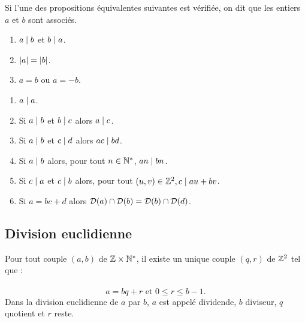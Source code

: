\begin{defprop}
    Si l’une des propositions équivalentes suivantes est vérifiée, on dit que les entiers \(a\) et \(b\) sont associés.
    \begin{enumerate}
        \item \(a \mid b\) et \(b \mid a\).
        \item \(\left\lvert a\right\rvert = \left\lvert b\right\rvert\).
        \item \(a = b\) ou \(a = -b\).
    \end{enumerate}
\end{defprop}

\begin{defprop}
    \begin{enumerate}
        \item \(a \mid a\).
        \item Si \(a \mid b\) et \(b \mid c\) alors \(a \mid c\).
        \item Si \(a \mid b\) et \(c \mid d\) alors \(ac \mid bd\).
        \item Si \(a \mid b\) alors, pour tout \(n \in \mathbb{N}^*\), \(an\mid bn\).
        \item Si \(c \mid a\) et \(c \mid b \) alors, pour tout \( (u, v) \in\mathbb{Z}^2, c \mid au + bv\).
        \item Si \(a = bc + d\) alors \(\mathcal{D}(a) \cap \mathcal{D}(b) = \mathcal{D}(b) \cap \mathcal{D}(d)\).
    \end{enumerate}
\end{defprop}

\subsection{Division euclidienne}
\begin{theo}
    Pour tout couple \((a, b)\) de \(\mathbb{Z} \times \mathbb{N}^*\), il existe un unique couple \((q, r)\) de \(\mathbb{Z}^2\) tel que :\\~\\
    \[a = bq + r \text{ et } 0 \leq r \leq b - 1.\]
    Dans la division euclidienne de \(a\) par \(b\), \(a\) est appelé dividende, \(b\) diviseur, \(q\) quotient et \(r\) reste.
\end{theo}

